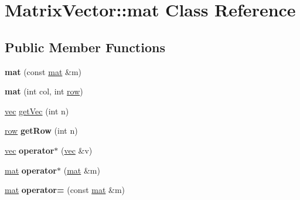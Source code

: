 \hypertarget{class_matrix_vector_1_1mat}{}\section{Matrix\+Vector\+:\+:mat Class Reference}
\label{class_matrix_vector_1_1mat}
\subsection*{Public Member Functions}
\begin{DoxyCompactItemize}
\item 
\mbox{\label{class_matrix_vector_1_1mat_ac6734773d8d3b42b1f2599592fadb8f1}} 
{\bfseries mat} (const \mbox{\hyperlink{class_matrix_vector_1_1mat}{mat}} \&m)
\item 
\mbox{\label{class_matrix_vector_1_1mat_ae97f3cb1740056f1aaacde6038c37200}} 
{\bfseries mat} (int col, int \mbox{\hyperlink{class_matrix_vector_1_1row}{row}})
\item 
\mbox{\hyperlink{class_matrix_vector_1_1vec}{vec}} \mbox{\hyperlink{class_matrix_vector_1_1mat_af971b3b347cdb13e134824d386d2b605}{get\+Vec}} (int n)
\item 
\mbox{\label{class_matrix_vector_1_1mat_acada5c913176b8fa304a4a9d13f8ce3d}} 
\mbox{\hyperlink{class_matrix_vector_1_1row}{row}} {\bfseries get\+Row} (int n)
\item 
\mbox{\label{class_matrix_vector_1_1mat_a1539eaf746ccc04ddd9fb44c08c6aecd}} 
\mbox{\hyperlink{class_matrix_vector_1_1vec}{vec}} {\bfseries operator$\ast$} (\mbox{\hyperlink{class_matrix_vector_1_1vec}{vec}} \&v)
\item 
\mbox{\label{class_matrix_vector_1_1mat_adca8a2d2d0c73d5e35d602b0c0ca858f}} 
\mbox{\hyperlink{class_matrix_vector_1_1mat}{mat}} {\bfseries operator$\ast$} (\mbox{\hyperlink{class_matrix_vector_1_1mat}{mat}} \&m)
\item 
\mbox{\label{class_matrix_vector_1_1mat_a57c3d94280727f931cefd9ce26c54ec7}} 
\mbox{\hyperlink{class_matrix_vector_1_1mat}{mat}} {\bfseries operator=} (const \mbox{\hyperlink{class_matrix_vector_1_1mat}{mat}} \&m)

\end{DoxyCompactItemize}
